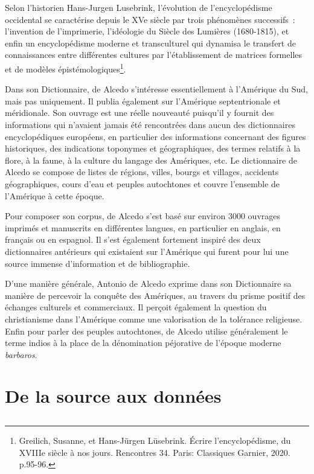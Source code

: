 \documentclass[a4paper,12pt,twoside]{book}
\begin{document}
Selon l’historien Hans-Jurgen Lusebrink, l’évolution de l’encyclopédisme occidental se caractérise depuis le XVe siècle par trois phénomènes successifs : l’invention de l’imprimerie, l’idéologie du Siècle des Lumières (1680-1815), et enfin un encyclopédisme moderne et transculturel qui dynamisa le transfert de connaissances entre différentes cultures par l’établissement de matrices formelles et de modèles épistémologiques\footnote{Greilich, Susanne, et Hans-Jürgen Lüsebrink. Écrire l’encyclopédisme, du XVIIIe siècle à nos jours. Rencontres 34. Paris: Classiques Garnier, 2020. p.95-96.}.
	
Dans son Dictionnaire, de Alcedo s’intéresse essentiellement à l’Amérique du Sud, mais pas uniquement. Il publia également sur l’Amérique septentrionale et méridionale. Son ouvrage est une réelle nouveauté puisqu’il y fournit des informations qui n’avaient jamais été rencontrées dans aucun des dictionnaires encyclopédiques européens, en particulier des informations concernant des figures historiques, des indications toponymes et géographiques, des termes relatifs à la flore, à la faune, à la culture du langage des Amériques, etc. Le dictionnaire de Alcedo se compose de listes de régions, villes, bourgs et villages, accidents géographiques, cours d’eau et peuples autochtones et couvre l’ensemble de l’Amérique à cette époque.

Pour composer son corpus, de Alcedo s’est basé sur environ 3000 ouvrages imprimés et manuscrits en différentes langues, en particulier en anglais, en français ou en espagnol. Il s’est également fortement inspiré des deux dictionnaires antérieurs qui existaient sur l’Amérique qui furent pour lui une source immense d’information et de bibliographie.

D’une manière générale, Antonio de Alcedo exprime dans son Dictionnaire sa manière de percevoir la conquête des Amériques, au travers du prisme positif des échanges culturels et commerciaux. Il perçoit également la question du christianisme dans l’Amérique comme une valorisation de la tolérance religieuse. Enfin pour parler des peuples autochtones, de Alcedo utilise généralement le terme indios à la place de la dénomination péjorative de l’époque moderne \textit{barbaros}. 
	
	\part{De la source aux données}
	
	\chapter{}
\end{document}
